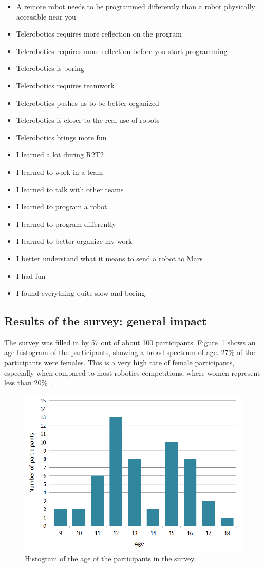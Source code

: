 \documentclass{intech-journal}
\begin{document}
\begin{itemize}
\item A remote robot needs to be programmed differently than a robot physically accessible near you 	
\item Telerobotics requires more reflection on the program 	
\item Telerobotics requires more reflection before you start programming 	
\item Telerobotics is boring 	
\item Telerobotics requires teamwork 	
\item Telerobotics pushes us to be better organized 	
\item Telerobotics is closer to the real use of robots 	
\item Telerobotics brings more fun
\item I learned a lot during R2T2 	
\item I learned to work in a team 	
\item I learned to talk with other teams 	
\item I learned to program a robot 	
\item I learned to program differently 	
\item I learned to better organize my work 	
\item I better understand what it means to send a robot to Mars 	
\item I had fun 	
\item I found everything quite slow and boring
\end{itemize}

\subsection{Results of the survey: general impact}

The survey was filled in by 57 out of about 100 participants. 
Figure~\ref{fig:age} shows an age histogram of the participants, showing a broad spectrum of age.
27\% of the participants were females.
This is a very high rate of female participants, especially when compared to most robotics competitions, where women represent less than 20\%~\cite{riedo2013upgrade}.

\begin{figure}[ht]
 \centering
    \includegraphics[width=0.5\columnwidth]{figures/Age.png}
  \caption{Histogram of the age of the participants in the survey.}
  \label{fig:age} 
\end{figure}
\end{document}
